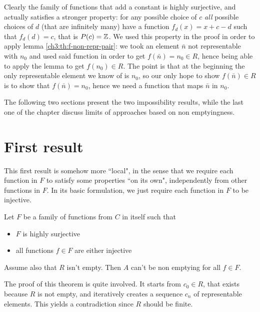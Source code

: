 Clearly the family of functions that add a constant is highly surjective, and actually satisfies a stronger property: for any possible choice of $c$ \textit{all} possible choices of $d$ (that are infinitely many) have a function $f_d(x) = x + c - d$ such that $f_d(d) = c$, that is $P(c) = \mathbb{Z}$. We used this property in the proof in order to apply lemma \ref{ch3:th:f-non-repr-pair}: we took an element $\bar{n}$ not representable with $n_0$ and used said function in order to get $f(\bar{n}) = n_0 \in R$, hence being able to apply the lemma to get $f(n_0) \in R$. The point is that at the beginning the only representable element we know of is $n_0$, so our only hope to show $f(\bar{n}) \in R$ is to show that $f(\bar{n}) = n_0$, hence we need a function that maps $\bar{n}$ in $n_0$.

The following two sections present the two impossibility results, while the last one of the chapter discuss limits of approaches based on non emptyingness.

\section{First result}
This first result is somehow more ``local", in the sense that we require each function in $F$ to satisfy some properties ``on its own", independently from other functions in $F$. In its basic formulation, we just require each function in $F$ to be injective.

\begin{theorem}\label{ch4:th:non-empt-res-local}
	Let $F$ be a family of functions from $C$ in itself such that
	\begin{itemize}
		\item $F$ is highly surjective
		\item all functions $f \in F$ are either injective
	\end{itemize}
	Assume also that $R$ isn't empty. Then $A$ can't be non emptying for all $f \in F$.
\end{theorem}
The proof of this theorem is quite involved. It starts from $c_0 \in R$, that exists because $R$ is not empty, and iteratively creates a sequence $c_n$ of representable elements. This yields a contradiction since $R$ should be finite.

